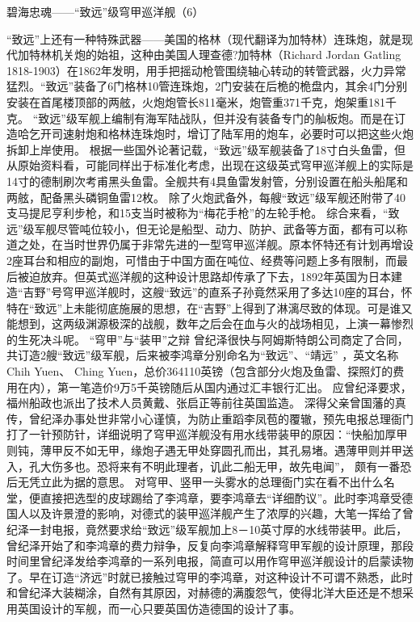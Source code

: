 \documentclass[12pt,UTF8]{ctexbook}
\begin{document}
碧海忠魂——“致远”级穹甲巡洋舰（6）

“致远”上还有一种特殊武器——美国的格林（现代翻译为加特林）连珠炮，就是现代加特林机关炮的始祖，这种由美国人理查德?加特林（Richard Jordan Gatling 1818-1903）在1862年发明，用手把摇动枪管围绕轴心转动的转管武器，火力异常猛烈。“致远”装备了6门格林10管连珠炮，2门安装在后桅的桅盘内，其余4门分别安装在首尾楼顶部的两舷，火炮炮管长811毫米，炮管重371千克，炮架重181千克。
“致远”级军舰上编制有海军陆战队，但并没有装备专门的舢板炮。而是在订造哈乞开司速射炮和格林连珠炮时，增订了陆军用的炮车，必要时可以把这些火炮拆卸上岸使用。
根据一些国外论著记载，“致远”级军舰装备了18寸白头鱼雷，但从原始资料看，可能同样出于标准化考虑，出现在这级英式穹甲巡洋舰上的实际是14寸的德制刷次考甫黑头鱼雷。全舰共有4具鱼雷发射管，分别设置在船头船尾和两舷，配备黑头磷铜鱼雷12枚。
除了火炮武备外，每艘“致远”级军舰还附带了40支马提尼亨利步枪，和15支当时被称为“梅花手枪”的左轮手枪。
综合来看，“致远”级军舰尽管吨位较小，但无论是船型、动力、防护、武备等方面，都有可以称道之处，在当时世界仍属于非常先进的一型穹甲巡洋舰。原本怀特还有计划再增设2座耳台和相应的副炮，可惜由于中国方面在吨位、经费等问题上多有限制，而最后被迫放弃。但英式巡洋舰的这种设计思路却传承了下去，1892年英国为日本建造“吉野”号穹甲巡洋舰时，这艘“致远”的直系子孙竟然采用了多达10座的耳台，怀特在“致远”上未能彻底施展的思想，在“吉野”上得到了淋漓尽致的体现。可是谁又能想到，这两级渊源极深的战舰，数年之后会在血与火的战场相见，上演一幕惨烈的生死决斗呢。
“穹甲”与“装甲”之辩
曾纪泽很快与阿姆斯特朗公司商定了合同，共订造2艘“致远”级军舰，后来被李鸿章分别命名为“致远”、“靖远” ，英文名称Chih Yuen、 Ching Yuen，总价364110英镑（包含部分火炮及鱼雷、探照灯的费用在内），第一笔造价9万5千英镑随后从国内通过汇丰银行汇出。 应曾纪泽要求，福州船政也派出了技术人员黄戴、张启正等前往英国监造。 深得父亲曾国藩的真传，曾纪泽办事处世非常小心谨慎，为防止重蹈李凤苞的覆辙，预先电报总理衙门打了一针预防针，详细说明了穹甲巡洋舰没有用水线带装甲的原因：“快船加厚甲则钝，薄甲反不如无甲，缘炮子遇无甲处穿圆孔而出，其孔易堵。遇薄甲则并甲送入，孔大伤多也。恐将来有不明此理者，讥此二船无甲，故先电闻”， 颇有一番恐后无凭立此为据的意思。
对穹甲、竖甲一头雾水的总理衙门实在看不出什么名堂，便直接把选型的皮球踢给了李鸿章，要李鸿章去“详细酌议”。此时李鸿章受德国人以及许景澄的影响，对德式的装甲巡洋舰产生了浓厚的兴趣，大笔一挥给了曾纪泽一封电报，竟然要求给“致远”级军舰加上8－10英寸厚的水线带装甲。此后，曾纪泽开始了和李鸿章的费力辩争，反复向李鸿章解释穹甲军舰的设计原理，那段时间里曾纪泽发给李鸿章的一系列电报，简直可以用作穹甲巡洋舰设计的启蒙读物了。早在订造“济远”时就已接触过穹甲的李鸿章，对这种设计不可谓不熟悉，此时和曾纪泽大装糊涂，自然有其原因，对赫德的满腹怨气，使得北洋大臣还是不想采用英国设计的军舰，而一心只要英国仿造德国的设计了事。
\end{document}
